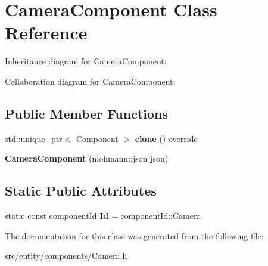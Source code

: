 \hypertarget{classCameraComponent}{\section{Camera\-Component Class Reference}
\label{classCameraComponent}
}


Inheritance diagram for Camera\-Component\-:


Collaboration diagram for Camera\-Component\-:
\subsection*{Public Member Functions}
\begin{DoxyCompactItemize}
\item 
\hypertarget{classCameraComponent_a820ca92b75c521612c6f20b28dbcf2ab}{std\-::unique\-\_\-ptr$<$ \hyperlink{classComponent}{Component} $>$ {\bfseries clone} () override}\label{classCameraComponent_a820ca92b75c521612c6f20b28dbcf2ab}

\item 
\hypertarget{classCameraComponent_a9cc82e3d7e147397d7052c2e327196a3}{{\bfseries Camera\-Component} (nlohmann\-::json json)}\label{classCameraComponent_a9cc82e3d7e147397d7052c2e327196a3}

\end{DoxyCompactItemize}
\subsection*{Static Public Attributes}
\begin{DoxyCompactItemize}
\item 
\hypertarget{classCameraComponent_adf7a08c6a07570dca05839807c63fd53}{static const component\-Id {\bfseries Id} = component\-Id\-::\-Camera}\label{classCameraComponent_adf7a08c6a07570dca05839807c63fd53}

\end{DoxyCompactItemize}


The documentation for this class was generated from the following file\-:\begin{DoxyCompactItemize}
\item 
src/entity/components/Camera.\-h\end{DoxyCompactItemize}
